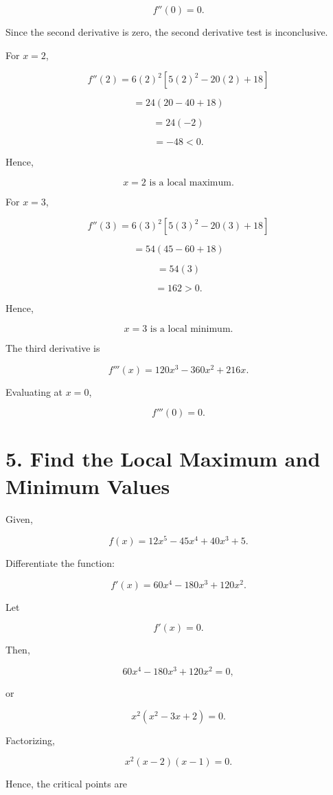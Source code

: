 \documentclass{article}
\begin{document}
\[
f''(0)=0.
\]

Since the second derivative is zero, the second derivative test is inconclusive.

\vspace{0.5cm}

For \(x=2\),

\[
f''(2)=6(2)^2\left[5(2)^2-20(2)+18\right]
\]

\[
=24(20-40+18)
\]

\[
=24(-2)
\]

\[
=-48<0.
\]

Hence,

\[
\boxed{x=2 \text{ is a local maximum}.}
\]

\vspace{0.5cm}

For \(x=3\),

\[
f''(3)=6(3)^2\left[5(3)^2-20(3)+18\right]
\]

\[
=54(45-60+18)
\]

\[
=54(3)
\]

\[
=162>0.
\]

Hence,

\[
\boxed{x=3 \text{ is a local minimum}.}
\]

\vspace{0.5cm}

The third derivative is

\[
f'''(x)=120x^3-360x^2+216x.
\]

Evaluating at \(x=0\),

\[
f'''(0)=0.
\]

\section*{5. Find the Local Maximum and Minimum Values}

Given,

\[
f(x)=12x^5-45x^4+40x^3+5.
\]

Differentiate the function:

\[
f'(x)=60x^4-180x^3+120x^2.
\]

Let

\[
f'(x)=0.
\]

Then,

\[
60x^4-180x^3+120x^2=0,
\]

or

\[
x^2(x^2-3x+2)=0.
\]

Factorizing,

\[
x^2(x-2)(x-1)=0.
\]

Hence, the critical points are
\end{document}
